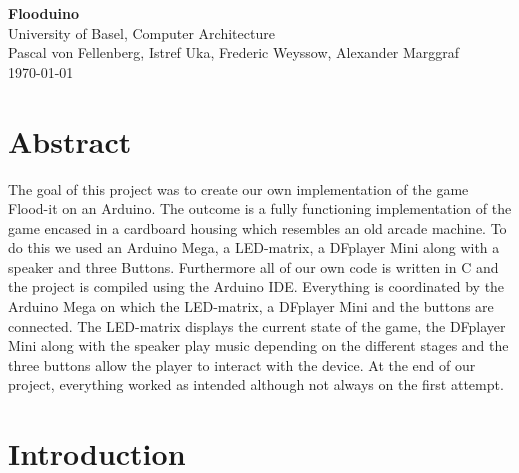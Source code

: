 \documentclass[10pt, a4paper]{article}
\begin{document}
\begin{center}
{\Huge \textbf{Flooduino}}\\
University of Basel, Computer Architecture\\
Pascal von Fellenberg, Istref Uka, Frederic Weyssow, Alexander Marggraf\\
\today
\end{center}

\section*{Abstract}

The goal of this project was to create our own implementation of the game Flood-it on an Arduino.  The outcome is a fully functioning implementation of the game encased in a cardboard housing which resembles an old arcade machine. To do this we used an Arduino Mega, a LED-matrix, a DFplayer Mini along with a speaker and three Buttons. Furthermore all of our own code is written in C and the project is compiled using the Arduino IDE. Everything is coordinated by the Arduino Mega on which the LED-matrix, a DFplayer Mini and the buttons are connected. The LED-matrix displays the current state of the game, the DFplayer Mini along with the speaker play music depending on the different stages and the three buttons allow the player to interact with the device. At the end of our project, everything worked as intended although not always on the first attempt. 

\section*{Introduction}
\end{document}
